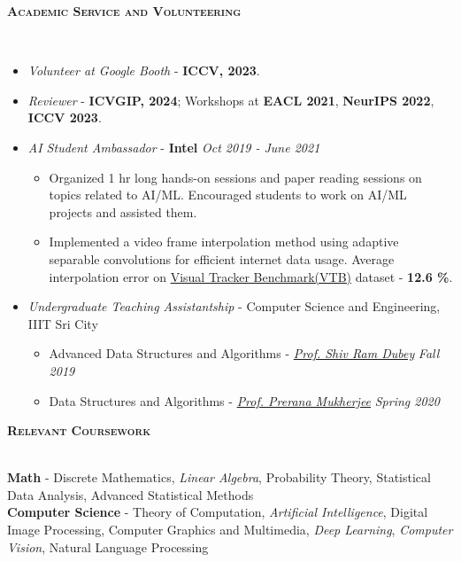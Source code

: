 \documentclass[10pt]{article}
\renewcommand{\section}[1]{
\bigskip
  \begin{Large}
  {\textsc{\textbf{#1}}}
  \end{Large}
  \hrulefill
  \medskip
  \\
}
\newenvironment{lonemidlist}[1][\enskip\textbullet]%
        {\begin{itemize}[#1,leftmargin=*,parsep=0pt,itemsep=4pt,topsep=0pt,partopsep=0pt]}
        {\end{itemize}}
\begin{document}
\section{Academic Service and Volunteering}
\vspace{-4mm}
\begin{lonemidlist}

\item \textit{Volunteer at Google Booth} - \textbf{ICCV, 2023}.
\item \textit{Reviewer} - \textbf{ICVGIP, 2024}; Workshops at \textbf{EACL 2021}, \textbf{NeurIPS 2022}, \textbf{ICCV 2023}.
\item \textit{AI Student Ambassador} - \textbf{Intel} \hfill {\textit{Oct 2019 - June 2021}}
  \begin{itemize}
        \item Organized 1 hr long hands-on sessions and paper reading sessions on topics related to AI/ML. Encouraged students to work on AI/ML projects and assisted them.
        \item Implemented a video frame interpolation method using adaptive separable convolutions for efficient internet data usage. Average interpolation error on \href{https://github.com/Debapriya-Tula/AdaConv-Pytorch}{Visual Tracker Benchmark(VTB)} dataset - \textbf{12.6 \%}.
  \end{itemize}
\item \textit{Undergraduate Teaching Assistantship} - Computer Science and Engineering, IIIT Sri City
  \begin{itemize}
        \item Advanced Data Structures and Algorithms - \href{https://profile.iiita.ac.in/srdubey/}{\textit{Prof. Shiv Ram Dubey}} \hfill{\textit{Fall 2019}}
        \item Data Structures and Algorithms - \href{https://mprerana.github.io/DrPreranaMukherjee/}{\textit{Prof. Prerana Mukherjee}} \hfill{\textit{Spring 2020}}
  \end{itemize}
\end{lonemidlist}
\vspace{1.0mm}

\section{Relevant Coursework}
\textbf{Math} - Discrete Mathematics, \textit{Linear Algebra}, Probability Theory, Statistical Data Analysis, Advanced Statistical Methods \\
\textbf{Computer Science} - Theory of Computation, \textit{Artificial Intelligence}, Digital Image Processing, Computer Graphics and Multimedia, \textit{Deep Learning}, \textit{Computer Vision}, Natural Language Processing
\vspace{1.0mm}
\end{document}
